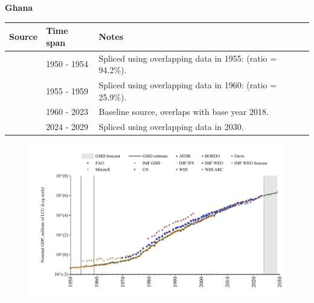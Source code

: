 \documentclass[12pt,a4paper,landscape]{article}
\begin{document}
\begin{adjustbox}{max totalsize={\paperwidth}{\paperheight},center}
\begin{minipage}[t][\textheight][t]{\textwidth}
\vspace*{0.5cm}
{}
\begin{center}
{\Large\bfseries Ghana}
\end{center}
\vspace{0.5cm}
\begin{table}[H]
\centering
\small
\begin{tabular}{|l|l|l|}
\hline
\textbf{Source} & \textbf{Time span} & \textbf{Notes} \\
\hline
\rowcolor{white}\cite{IMF_IFS}& 1950 - 1954 &Spliced using overlapping data in 1955: (ratio = 94.2\%).\\
\rowcolor{lightgray}\cite{IMF_GDD}& 1955 - 1959 &Spliced using overlapping data in 1960: (ratio = 25.9\%).\\
\rowcolor{white}\cite{WDI}& 1960 - 2023 &Baseline source, overlaps with base year 2018.\\
\rowcolor{lightgray}\cite{IMF_WEO_forecast}& 2024 - 2029 &Spliced using overlapping data in 2030.\\
\hline
\end{tabular}
\end{table}
\begin{figure}[H]
\centering
\includegraphics[width=\textwidth,height=0.6\textheight,keepaspectratio]{graphs/GHA_nGDP.pdf}
\end{figure}
\end{minipage}
\end{adjustbox}
\end{document}
